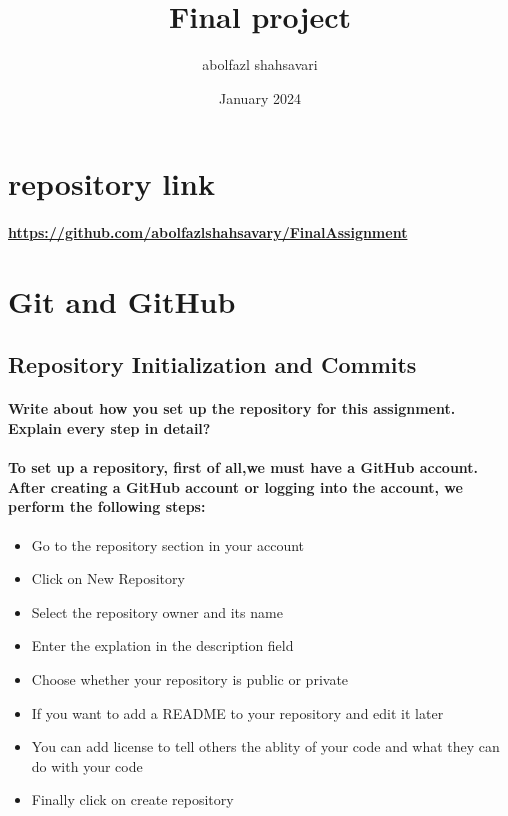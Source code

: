 \documentclass[12pt]{article}
\title{Final project}
\author{abolfazl shahsavari}
\date{January 2024}
\begin{document}
\maketitle
\newpage
\tableofcontents
\newpage

\section{repository link}
\paragraph{\url{https://github.com/abolfazlshahsavary/FinalAssignment}}
\section{Git and GitHub}
\subsection{Repository Initialization and Commits}
\paragraph{Write about how you set up the repository for this assignment. Explain every step in detail?}
\paragraph{To set up a repository, first of all,we must have a GitHub account. After creating a GitHub account or logging into the account, we perform the following steps:}

\begin{itemize}
    \item Go to the repository section in your account
    \item Click on New Repository
    \item Select the repository owner and its name
    \item Enter the explation in the description field
    \item Choose whether your repository is public or private
    \item If you want to add a README to your repository and edit it later
    \item You can add license to tell others the ablity of your code and what they can do with your code
    \item Finally click on create repository 
\end{itemize}
\end{document}
